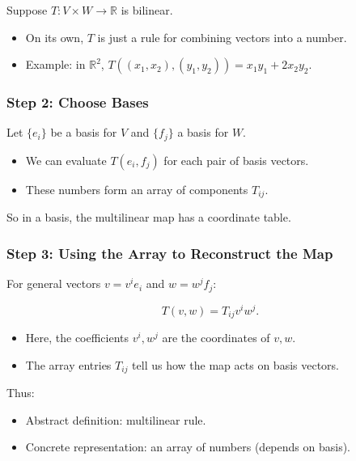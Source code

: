 \documentclass[
  letterpaper,
  DIV=11,
  numbers=noendperiod]{scrreprt}
\providecommand{\tightlist}{%
  \setlength{\itemsep}{0pt}\setlength{\parskip}{0pt}}
\begin{document}
Suppose \(T: V \times W \to \mathbb{R}\) is bilinear.

\begin{itemize}
\tightlist
\item
  On its own, \(T\) is just a rule for combining vectors into a number.
\item
  Example: in \(\mathbb{R}^2\),
  \(T((x_1,x_2),(y_1,y_2)) = x_1 y_1 + 2x_2 y_2\).
\end{itemize}

\subsubsection{Step 2: Choose Bases}\label{step-2-choose-bases}

Let \(\{e_i\}\) be a basis for \(V\) and \(\{f_j\}\) a basis for \(W\).

\begin{itemize}
\tightlist
\item
  We can evaluate \(T(e_i,f_j)\) for each pair of basis vectors.
\item
  These numbers form an array of components \(T_{ij}\).
\end{itemize}

So in a basis, the multilinear map has a coordinate table.

\subsubsection{Step 3: Using the Array to Reconstruct the
Map}\label{step-3-using-the-array-to-reconstruct-the-map}

For general vectors \(v = v^i e_i\) and \(w = w^j f_j\):

\[
T(v,w) = T_{ij} v^i w^j.
\]

\begin{itemize}
\tightlist
\item
  Here, the coefficients \(v^i, w^j\) are the coordinates of \(v, w\).
\item
  The array entries \(T_{ij}\) tell us how the map acts on basis
  vectors.
\end{itemize}

Thus:

\begin{itemize}
\tightlist
\item
  Abstract definition: multilinear rule.
\item
  Concrete representation: an array of numbers (depends on basis).
\end{itemize}
\end{document}
